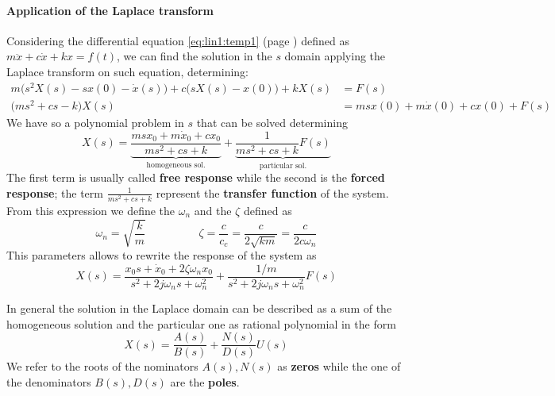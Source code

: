 		\paragraph{Application of the Laplace transform} Considering the differential equation \ref{eq:lin1:temp1} (page \pageref{eq:lin1:temp1}) defined as $m\ddot x + c\dot x + kx = f(t)$, we can find the solution in the $s$ domain applying the Laplace transform on such equation, determining:
		\begin{align*}
			m\big(s^2 X(s) - s x(0) - \dot x(s)\big) + c \big(sX(s) - x(0)\big) + kX(s) & = F(s) \\
			\big(ms^2 + cs - k\big)X(s) & = msx(0) + m\dot x(0) + cx(0) + F(s)
		\end{align*}
		We have so a polynomial problem in $s$ that can be solved determining
		\[ X(s) = \underbrace{\frac{msx_0+ m\dot x_0 + cx_0}{ms^2 + cs + k}}_\textrm{homogeneous sol.} + \underbrace{\frac{1}{ms^2 + cs + k}F(s)}_\textrm{particular sol.} \]
		The first term is usually called \textbf{free response} while the second is the \textbf{forced response}; the term $\frac{1}{ms^2 + cs + k} $ represent the \textbf{transfer function} of the system. From this expression we define the  $\omega_n$ and the  $\zeta$ defined as
		\begin{equation}
			\omega_n = \sqrt{ \frac k m} \hspace{2cm} \zeta =\frac{c}{c_c} = \frac{c}{2\sqrt{km}} = \frac{c}{2c \omega_n}
		\end{equation}
		This parameters allows to rewrite the response of the system as
		\begin{equation} \label{eq:lin1:temp2}
			X(s) = \frac{x_0s + \dot x_0 + 2 \zeta \omega_n x_0}{s^2 + 2 j\omega_ns + \omega_n^2} + \frac{1/m}{s^2 + 2 j \omega_n s + \omega_n^2} F(s)
		\end{equation}
		
		In general the solution in the Laplace domain can be described as a sum of the homogeneous solution and the particular one as rational polynomial in the form
		\[ X(s) = \frac{A(s)}{B(s)} + \frac{N(s)}{D(s)} U(s) \]
		We refer to the roots of the nominators $A(s),N(s)$ as \textbf{zeros} while the one of the denominators $B(s),D(s)$ are the \textbf{poles}.
	
